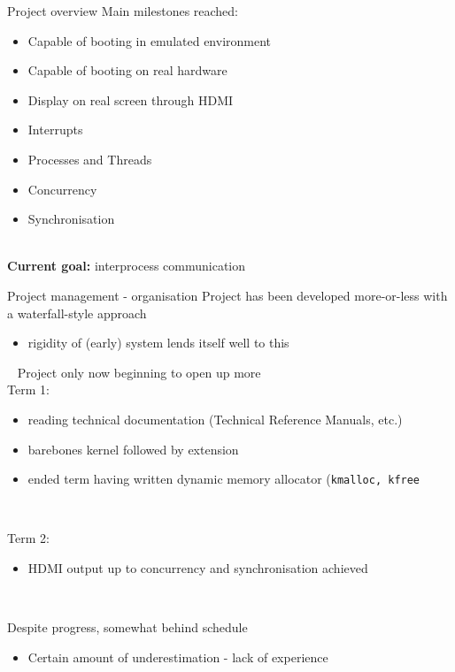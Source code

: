 \documentclass[10pt]{beamer}
\newcommand{\code}[1]{\texttt{#1}}
\begin{document}
\begin{frame}{Project overview}
    Main milestones reached:
    \begin{itemize}
        \item Capable of booting in emulated environment
        \item Capable of booting on real hardware
        \item Display on real screen through HDMI
        \item Interrupts
        \item Processes and Threads
        \item Concurrency
        \item Synchronisation
    \end{itemize} ~\\

    \textbf{Current goal:} interprocess communication
\end{frame}

\begin{frame}{Project management - organisation}
    Project has been developed more-or-less with a waterfall-style approach
    \begin{itemize}
        \item rigidity of (early) system lends itself well to this
    \end{itemize} ~
    Project only now beginning to open up more \\

    Term 1:
    \begin{itemize}
        \item reading technical documentation (Technical Reference Manuals,
            etc.)
        \item barebones kernel followed by extension
        \item ended term having written dynamic memory allocator (\code{kmalloc,
            kfree}
    \end{itemize} ~

    Term 2:
    \begin{itemize}
        \item HDMI output up to concurrency and synchronisation achieved
    \end{itemize} ~

    Despite progress, somewhat behind schedule
    \begin{itemize}
        \item Certain amount of underestimation - lack of experience
    \end{itemize}
\end{frame}
\end{document}
